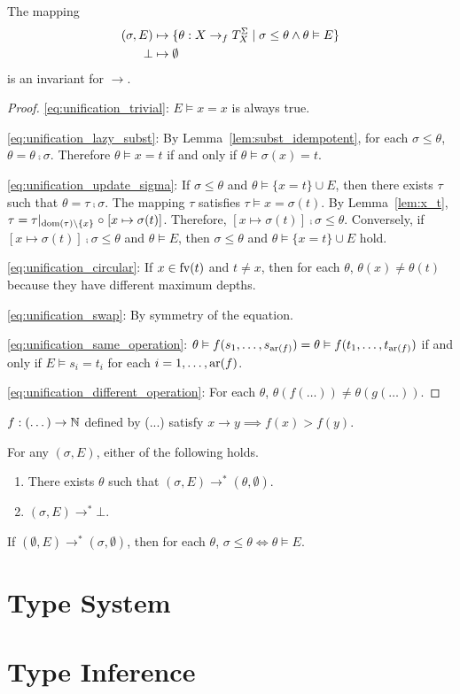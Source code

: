 \documentclass[draft]{llncs}
\begin{document}
\begin{myconjecture}
	The mapping
	\begin{align}
		(\sigma, E) &\mapsto \{ \theta : X \to_{f} T^{\Sigma}_{X} \mid \sigma \le \theta \land \theta \vDash E \} \\
		\bot &\mapsto \emptyset
	\end{align}
	is an invariant for ${\to}$.
\end{myconjecture}
\begin{proof}
	\eqref{eq:unification_trivial}: $E \vDash x = x$ is always true.

	\eqref{eq:unification_lazy_subst}: By Lemma~\ref{lem:subst_idempotent}, for each $\sigma \le \theta$, $\theta = \theta \comp \sigma$.
	Therefore $\theta \vDash x = t$ if and only if $\theta \vDash \sigma(x) = t$.

	\eqref{eq:unification_update_sigma}: If $\sigma \le \theta$ and $\theta \vDash \{x = t\} \cup E$, then there exists $\tau$ such that $\theta = \tau \comp \sigma$.
	The mapping $\tau$ satisfies $\tau \vDash x = \sigma(t)$.
	By Lemma~\ref{lem:x_t}, $\tau = \tau|_{\mathrm{dom}(\tau) \setminus \{ x \}} \mathrel{\circ} [x \mapsto \sigma(t)]$.
	Therefore, $[x \mapsto \sigma(t)] \comp \sigma \le \theta$.
	Conversely, if $[x \mapsto \sigma(t)] \comp \sigma \le \theta$ and $\theta \vDash E$, then $\sigma \le \theta$ and $\theta \vDash \{x = t\} \cup E$ hold.

	\eqref{eq:unification_circular}: If $x \in \mathrm{fv}({t})$ and $t \neq x$, then for each $\theta$, $\theta (x) \neq \theta(t)$ because they have different maximum depths.

	\eqref{eq:unification_swap}: By symmetry of the equation.

	\eqref{eq:unification_same_operation}: $\theta \vDash f(s_1, \dots, s_{\mathrm{ar}({f})}) = \theta \vDash f(t_1, \dots, t_{\mathrm{ar}({f})})$ if and only if $E \vDash s_i = t_i$ for each $i = 1, \dots, \mathrm{ar}({f})$.

	\eqref{eq:unification_different_operation}: For each $\theta$, $\theta(f(\dots)) \neq \theta(g(\dots))$.
\end{proof}

\begin{myconjecture}
	$f : (\dots) \to \mathbb{N}$ defined by (...) satisfy $x \to y \implies f(x) > f(y)$.
\end{myconjecture}

\begin{mycorollary}
	For any $(\sigma, E)$, either of the following holds.
	\begin{enumerate}
		\item There exists $\theta$ such that $(\sigma, E) \to^{*} (\theta, \emptyset)$.
		\item $(\sigma, E) \to^{*} \bot$.
	\end{enumerate}
\end{mycorollary}
\begin{mycorollary}
	If $(\emptyset, E) \to^{*} (\sigma, \emptyset)$, then for each $\theta$, $\sigma \le \theta \iff \theta \vDash E$.
\end{mycorollary}

\section{Type System}

\section{Type Inference}



\end{document}
